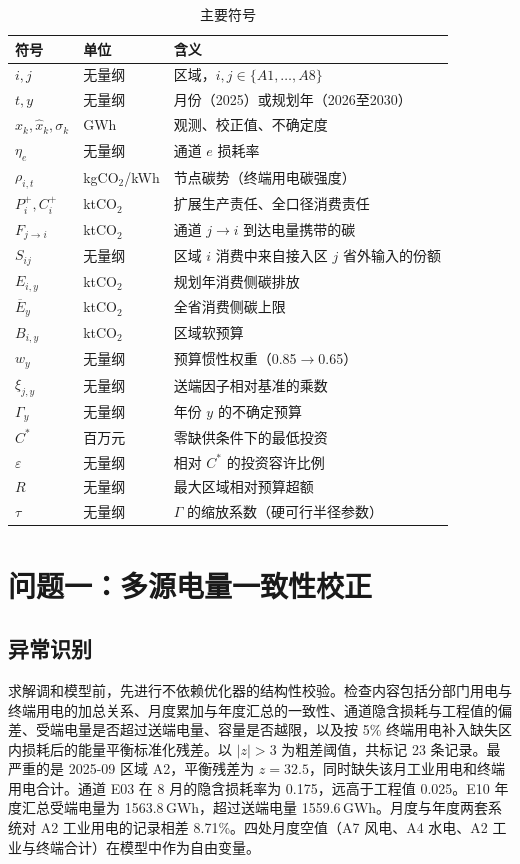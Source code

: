 \documentclass[UTF8,a4paper,zihao=-4,fontset=fandol]{ctexart}
\begin{document}
\begin{table}[htbp]
\centering
\caption{主要符号}
\label{tab:symbol}
\begin{tabular}{llp{7.6cm}}
\toprule
符号 & 单位 & 含义 \\
\midrule
$i,j$ & 无量纲 & 区域，$i,j\in\{A1,\ldots,A8\}$ \\
$t,y$ & 无量纲 & 月份（2025）或规划年（2026至2030） \\
$x_k,\hat x_k,\sigma_k$ & GWh & 观测、校正值、不确定度 \\
$\eta_e$ & 无量纲 & 通道 $e$ 损耗率 \\
$\rho_{i,t}$ & kgCO$_2$/kWh & 节点碳势（终端用电碳强度） \\
$P^+_i,C^+_i$ & ktCO$_2$ & 扩展生产责任、全口径消费责任 \\
$F_{j\to i}$ & ktCO$_2$ & 通道 $j\to i$ 到达电量携带的碳 \\
$S_{ij}$ & 无量纲 & 区域 $i$ 消费中来自接入区 $j$ 省外输入的份额 \\
$E_{i,y}$ & ktCO$_2$ & 规划年消费侧碳排放 \\
$\overline E_y$ & ktCO$_2$ & 全省消费侧碳上限 \\
$B_{i,y}$ & ktCO$_2$ & 区域软预算 \\
$w_y$ & 无量纲 & 预算惯性权重（0.85$\to$0.65） \\
$\xi_{j,y}$ & 无量纲 & 送端因子相对基准的乘数 \\
$\Gamma_y$ & 无量纲 & 年份 $y$ 的不确定预算 \\
$C^*$ & 百万元 & 零缺供条件下的最低投资 \\
$\varepsilon$ & 无量纲 & 相对 $C^*$ 的投资容许比例 \\
$R$ & 无量纲 & 最大区域相对预算超额 \\
$\tau$ & 无量纲 & $\Gamma$ 的缩放系数（硬可行半径参数） \\
\bottomrule
\end{tabular}
\end{table}

\section{问题一：多源电量一致性校正}

\subsection{异常识别}

求解调和模型前，先进行不依赖优化器的结构性校验。检查内容包括分部门用电与终端用电的加总关系、月度累加与年度汇总的一致性、通道隐含损耗与工程值的偏差、受端电量是否超过送端电量、容量是否越限，以及按 5\% 终端用电补入缺失区内损耗后的能量平衡标准化残差。以 $|z|>3$ 为粗差阈值，共标记 23 条记录。最严重的是 2025-09 区域 A2，平衡残差为 $z=32.5$，同时缺失该月工业用电和终端用电合计。通道 E03 在 8 月的隐含损耗率为 0.175，远高于工程值 0.025。E10 年度汇总受端电量为 1563.8\,GWh，超过送端电量 1559.6\,GWh。月度与年度两套系统对 A2 工业用电的记录相差 8.71\%。四处月度空值（A7 风电、A4 水电、A2 工业与终端合计）在模型中作为自由变量。
\end{document}
